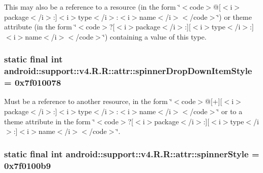 This may also be a reference to a resource (in the form \char`\"{}$<$code$>$@\mbox{[}$<$i$>$package$<$/i$>$:\mbox{]}$<$i$>$type$<$/i$>$:$<$i$>$name$<$/i$>$$<$/code$>$\char`\"{}) or theme attribute (in the form \char`\"{}$<$code$>$?\mbox{[}$<$i$>$package$<$/i$>$:\mbox{]}\mbox{[}$<$i$>$type$<$/i$>$:\mbox{]}$<$i$>$name$<$/i$>$$<$/code$>$\char`\"{}) containing a value of this type. \hypertarget{classandroid_1_1support_1_1v4_1_1_r_1_1attr_d020851f3cfd9b72e6211ebd5a1a7920}{
\subsubsection[{spinnerDropDownItemStyle}]{\setlength{\rightskip}{0pt plus 5cm}static final int android::support::v4.R.R::attr::spinnerDropDownItemStyle = 0x7f010078}}
\label{classandroid_1_1support_1_1v4_1_1_r_1_1attr_d020851f3cfd9b72e6211ebd5a1a7920}


Must be a reference to another resource, in the form \char`\"{}$<$code$>$@\mbox{[}+\mbox{]}\mbox{[}$<$i$>$package$<$/i$>$:\mbox{]}$<$i$>$type$<$/i$>$:$<$i$>$name$<$/i$>$$<$/code$>$\char`\"{} or to a theme attribute in the form \char`\"{}$<$code$>$?\mbox{[}$<$i$>$package$<$/i$>$:\mbox{]}\mbox{[}$<$i$>$type$<$/i$>$:\mbox{]}$<$i$>$name$<$/i$>$$<$/code$>$\char`\"{}. \hypertarget{classandroid_1_1support_1_1v4_1_1_r_1_1attr_3946ae03a59398d8b40f12b6f026ba08}{
\subsubsection[{spinnerStyle}]{\setlength{\rightskip}{0pt plus 5cm}static final int android::support::v4.R.R::attr::spinnerStyle = 0x7f0100b9}}
\label{classandroid_1_1support_1_1v4_1_1_r_1_1attr_3946ae03a59398d8b40f12b6f026ba08}


